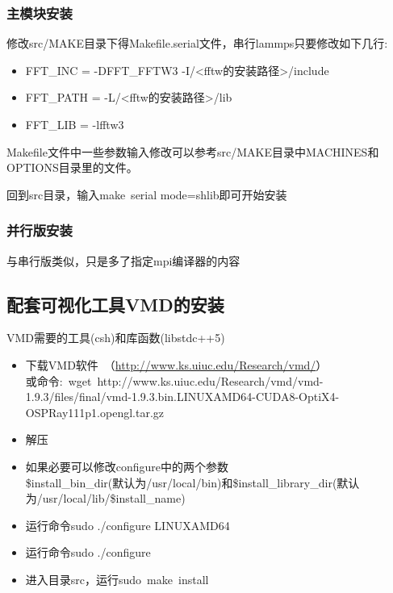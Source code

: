 \documentclass[10pt,a4paper]{article}
\begin{document}
\subsubsection{主模块安装}
修改\textrm{src/MAKE}目录下得\textrm{Makefile.serial}文件，串行\textrm{lammps}只要修改如下几行:
\begin{itemize}
	\item \textrm{FFT\_INC = -DFFT\_FFTW3 -I/<fftw的安装路径>/include}
	\item \textrm{FFT\_PATH = -L/<fftw的安装路径>/lib}
	\item \textrm{ FFT\_LIB = -lfftw3}
\end{itemize}
\textrm{Makefile}文件中一些参数输入修改可以参考\textrm{src/MAKE}目录中\textrm{MACHINES}和\textrm{OPTIONS}目录里的文件。

回到\textrm{src}目录，输入\textrm{make~serial mode=shlib}即可开始安装

\subsubsection{并行版安装}
与串行版类似，只是多了指定\textrm{mpi}编译器的内容

\subsection{配套可视化工具VMD的安装}
\textrm{VMD}需要的工具(\textrm{csh})和库函数(\textrm{libstdc++5})
\begin{itemize}
	\item 下载\textrm{VMD}软件~\textrm{（\url{http://www.ks.uiuc.edu/Research/vmd/}）}\\
		或命令:~\textrm{wget~http://www.ks.uiuc.edu/Research/vmd/vmd-1.9.3/files/final/vmd-1.9.3.bin.LINUXAMD64-CUDA8-OptiX4-OSPRay111p1.opengl.tar.gz}
	\item 解压
	\item 如果必要可以修改\textrm{configure}中的两个参数\\
		\textrm{\$install\_bin\_dir}(默认为\textrm{/usr/local/bin})和\textrm{\$install\_library\_dir}(默认为\textrm{/usr/local/lib/\$install\_name})
	\item 运行命令\textrm{sudo ./configure LINUXAMD64}
	\item 运行命令\textrm{sudo ./configure}
	\item 进入目录\textrm{src}，运行\textrm{sudo~make~install}
\end{itemize}
\end{document}
